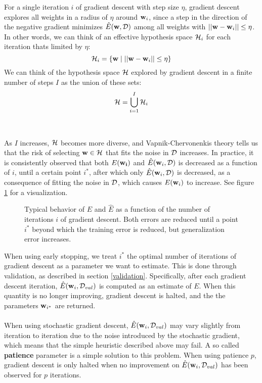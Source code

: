 For a single iteration $i$ of gradient descent with step size $\eta$, gradient descent explores all weights in a radius of $\eta$ around $\mathbf{w}_i$, since a step in the direction of the negative gradient minimizes $\hat{E}(\mathbf{w}, \mathcal{D})$ among all weights with $||\mathbf{w} - \mathbf{w}_i|| \leq \eta$. In other words, we can think of an effective hypothesis space $\mathcal{H}_i$ for each iteration thats limited by $\eta$:
$$
\mathcal{H}_i = \{\mathbf{w} \mid ||\mathbf{w} - \mathbf{w}_i|| \leq \eta\}
$$
We can think of the hypothesis space $\mathcal{H}$ explored by gradient descent in a finite number of steps $I$ as the union of these sets:
$$
\mathcal{H} = \bigcup\limits_{i = 1}^I \mathcal{H}_i
$$
\\\\
As $I$ increases, $\mathcal{H}$ becomes more diverse, and Vapnik-Chervonenkis theory tells us that the risk of selecting $\mathbf{w} \in \mathcal{H}$ that fits the noise in $\mathcal{D}$ increases. In practice, it is consistently observed that both $E(\mathbf{w_i})$ and $\hat{E}(\mathbf{w}_i, \mathcal{D})$ is decreased as a function of $i$, until a certain point $i^*$, after which only $\hat{E}(\mathbf{w}_i, \mathcal{D})$ is decreased, as a consequence of fitting the noise in $\mathcal{D}$, which causes $E(\mathbf{w}_i)$ to increase. See figure \ref{early_stopping} for a visualization.
\begin{figure}
	
	\caption{Typical behavior of $E$ and $\hat{E}$ as a function of the number of iterations $i$ of gradient descent. Both errors are reduced until a point $i^*$ beyond which the training error is reduced, but generalization error increases.}
	\label{early_stopping}
\end{figure}
When using early stopping, we treat $i^*$ the optimal number of iterations of gradient descent as a parameter we want to estimate. This is done through validation, as described in section \ref{validation}. Specifically, after each gradient descent iteration, $\hat{E}(\mathbf{w}_i, \mathcal{D}_{val})$ is computed as an estimate of $E$. When this quantity is no longer improving, gradient descent is halted, and the the parameters $\mathbf{w}_{i^*}$ are returned.
\\\\
When using stochastic gradient descent, $\hat{E}(\mathbf{w}_i, \mathcal{D}_{val})$ may vary slightly from iteration to iteration due to the noise introduced by the stochastic gradient, which means that the simple heuristic described above may fail. A so called \textbf{patience} parameter is a simple solution to this problem. When using patience $p$, gradient descent is only halted when no improvement on $\hat{E}(\mathbf{w}_i, \mathcal{D}_{val})$ has been observed for $p$ iterations.